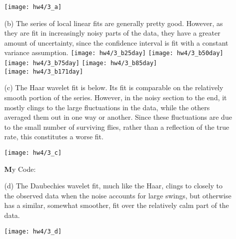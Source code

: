 \documentclass[11pt]{article}
\theoremstyle{definition}
\begin{document}
\begin{itemize}
\begin{itemize}
                \begin{center}
                    \texttt{[image: hw4/3\_a]} 
                \end{center}
            \item[(b)] 
                The series of local linear fits are generally pretty good. However, as they are fit in increasingly noisy parts of the data, they have a greater amount of uncertainty, since the confidence interval is fit with a constant variance assumption.
                    \texttt{[image: hw4/3\_b25day]} 
                    \texttt{[image: hw4/3\_b50day]}  \\
                    \texttt{[image: hw4/3\_b75day]} 
                    \texttt{[image: hw4/3\_b85day]}  \\
                    \texttt{[image: hw4/3\_b171day]} 
            \item[(c)]
                The Haar wavelet fit is below. Its fit is comparable on the relatively smooth portion of the series. However, in the noisy section to the end, it mostly clings to the large fluctuations in the data, while the others averaged them out in one way or another. Since these fluctuations are due to the small number of surviving flies, rather than a reflection of the true rate, this constitutes a worse fit.
                \begin{center}
                    \texttt{[image: hw4/3\_c]} 
                \end{center}
                {\textbf My Code:}
               
            \item[(d)]
                The Daubechies wavelet fit, much like the Haar, clings to closely to the observed data when the noise accounts for large swings, but otherwise has a similar, somewhat smoother, fit over the relatively calm part of the data.
                \begin{center}
                    \texttt{[image: hw4/3\_d]} 
                \end{center}
            

\end{itemize}
\end{itemize}
\end{document}
